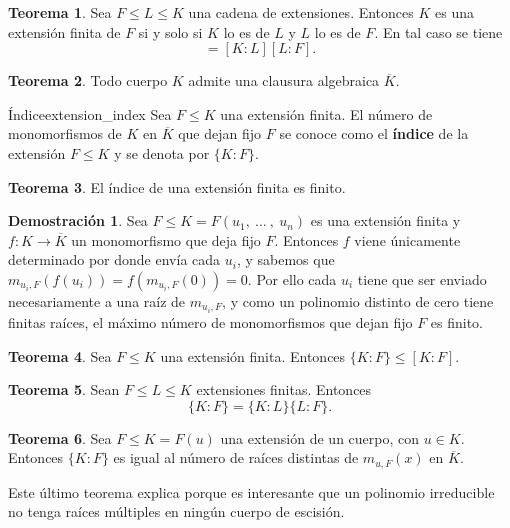 \documentclass[a4paper]{book}
\theoremstyle{definition}
\newtheorem{theorem}{Teorema}[section]
\theoremstyle{ejemplo}
\theoremstyle{demostracion}
\newtheorem{dem}{Demostración}
\begin{document}
\begin{theorem}
	Sea $F \leq L \leq K$ una cadena de extensiones. Entonces $K$ es una extensión finita de $F$ si y solo si $K$ lo es de $L$ y $L$ lo es de $F$. En tal caso se tiene
	\begin{equation*}
		[K:F] = [K:L][L:F].
	\end{equation*}
\end{theorem}

\begin{theorem}
	Todo cuerpo $K$ admite una clausura algebraica $\overline{K}$.
\end{theorem}

\begin{define}{Índice}{extension_index}
	Sea $F \leq K$ una extensión finita. El número de monomorfismos de $K$ en $\overline{K}$ que dejan fijo $F$ se conoce como el \textbf{índice} de la extensión $F \leq K$ y se denota por $\{K:F\}$.
\end{define}

\begin{theorem}
	El índice de una extensión finita es finito.
\end{theorem}

\begin{dem}
	Sea $F \leq K = F(u_1,\ \ldots\ ,\ u_n)$ es una extensión finita y $f:K \rightarrow \overline{K}$ un monomorfismo que deja fijo $F$. Entonces $f$ viene únicamente determinado por donde envía cada $u_i$, y sabemos que $m_{u_i,F}(f(u_i)) = f(m_{u_i,F}(0)) = 0$. Por ello cada $u_i$ tiene que ser enviado necesariamente a una raíz de $m_{u_i,F}$, y como un polinomio distinto de cero tiene finitas raíces, el máximo número de monomorfismos que dejan fijo $F$ es finito.
\end{dem}

\begin{theorem}
	Sea $F \leq K$ una extensión finita. Entonces $\{K:F\} \leq [K:F]$.
\end{theorem}

\begin{theorem}
	Sean $F \leq L \leq K$ extensiones finitas. Entonces
	\begin{equation*}
		\{K:F\} = \{K:L\} \{L:F\}.
	\end{equation*}
\end{theorem}

\begin{theorem}
	Sea $F \leq K = F(u)$ una extensión de un cuerpo, con $u \in K$. Entonces $\{K:F\}$ es igual al número de raíces distintas de $m_{u,F}(x)$ en $\overline{K}$.
\end{theorem}
Este último teorema explica porque es interesante que un polinomio irreducible no tenga raíces múltiples en ningún cuerpo de escisión.
\end{document}
